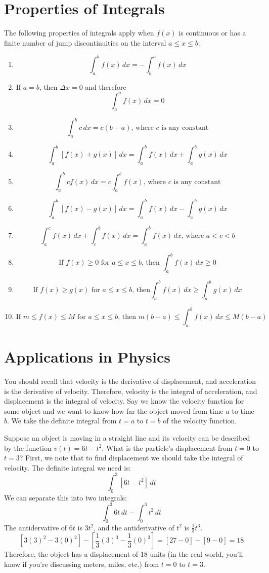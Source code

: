 \section{Properties of Integrals}
The following properties of integrals apply when $f(x)$ is continuous or has a finite number of jump discontinuities on the interval $a \leq x \leq b$:
\begin{enumerate}
\item $$\int_{a}^{b}f(x)\, dx = -\int_{b}^{a}f(x)\, dx$$ %
\item If $a=b$, then $\Delta x = 0$ and therefore $$\int_{a}^{a}f(x)\, dx = 0$$%
\item $$\int_{a}^{b}c\,dx = c(b-a)\text{, where }c\text{ is any constant}$$%
\item $$\int_{a}^{b}[f(x) + g(x)]\,dx = \int_{a}^{b}f(x)\,dx + \int_{a}^{b}g(x)\,dx$$%
\item $$\int_{a}^{b}cf(x)\,dx = c\int_{a}^{b}f(x)\text{, where }c\text{ is any constant}$$%
\item $$\int_{a}^{b}[f(x) - g(x)]\,dx = \int_{a}^{b}f(x)\,dx - \int_{a}^{b}g(x)\,dx$$%
\item $$\int_{a}^{c} f(x)\,dx + \int_{c}^{b}f(x)\,dx = \int_{a}^{b}f(x)\,dx\text{, where }a<c<b$$%
\item $$\text{If }f(x) \geq 0\text{ for }a\leq x\leq b\text{, then }\int_{a}^{b}f(x)\,dx \geq0$$%
\item $$\text{If }f(x)\geq g(x)\text{ for }a\leq x \leq b\text{, then}\int_{a}^{b}f(x)\,dx \geq \int_{a}^{b}g(x)\,dx$$%
\item $$\text{If } m \leq f(x) \leq M\text{ for }a\leq x \leq b\text{, then }m(b-a)\leq \int_{a}^{b}f(x)\,dx \leq M(b-a)$$%
\end{enumerate}


\section{Applications in Physics}
You should recall that velocity is the derivative of displacement, and acceleration is the derivative of velocity. Therefore, velocity is the integral of acceleration, and displacement is the integral of velocity. Say we know the velocity function for some object and we want to know how far the object moved from time $a$ to time $b$. We take the definite integral from $t=a$ to $t=b$ of the velocity function. 

Suppose an object is moving in a straight line and its velocity can be described by the function $v(t) = 6t-t^2$. What is the particle's displacement from $t=0$ to $t=3$? First, we note that to find displacement we should take the integral of velocity. The definite integral we need is:
$$\int_{0}^{3} [6t-t^2]\,dt$$
We can separate this into two integrals:
$$\int_{0}^{3} 6t\,dt -\int_{0}^{3}t^2\,dt$$
The antidervative of $6t$ is $3t^2$, and the antiderivative of $t^2$ is $\frac{1}{3}t^3$. 
$$[3(3)^2-3(0)^2]-[\frac{1}{3}(3)^3-\frac{1}{3}(0)^3]=[27-0]-[9-0]=18$$
Therefore, the object has a displacement of 18 units (in the real world, you'll know if you're discussing meters, miles, etc.) from $t=0$ to $t=3$. 

